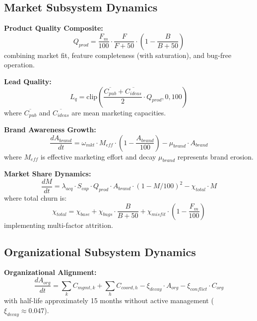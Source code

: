 \documentclass[alpha-refs]{wiley-article}
\begin{document}
\subsection{Market Subsystem Dynamics}

\textbf{Product Quality Composite:}
\begin{equation}
Q_{prod} = \frac{F_m}{100} \cdot \frac{F}{F + 50} \cdot \left(1 - \frac{B}{B + 50}\right)
\end{equation}
combining market fit, feature completeness (with saturation), and bug-free operation.

\textbf{Lead Quality:}
\begin{equation}
L_q = \text{clip}\left(\frac{\overline{C_{pub}} + \overline{C_{ideas}}}{2} \cdot Q_{prod}, 0, 100\right)
\end{equation}
where $\overline{C_{pub}}$ and $\overline{C_{ideas}}$ are mean marketing capacities.

\textbf{Brand Awareness Growth:}
\begin{equation}
\frac{dA_{brand}}{dt} = \omega_{mkt} \cdot M_{eff} \cdot \left(1 - \frac{A_{brand}}{100}\right) - \mu_{brand} \cdot A_{brand}
\end{equation}
where $M_{eff}$ is effective marketing effort and decay $\mu_{brand}$ represents brand erosion.

\textbf{Market Share Dynamics:}
\begin{equation}
\frac{dM}{dt} = \lambda_{acq} \cdot S_{cap} \cdot Q_{prod} \cdot A_{brand} \cdot (1-M/100)^2 - \chi_{total} \cdot M
\end{equation}
where total churn is:
\begin{equation}
\chi_{total} = \chi_{base} + \chi_{bugs} \cdot \frac{B}{B + 50} + \chi_{misfit} \cdot \left(1 - \frac{F_m}{100}\right)
\end{equation}
implementing multi-factor attrition.

\subsection{Organizational Subsystem Dynamics}

\textbf{Organizational Alignment:}
\begin{equation}
\frac{dA_{org}}{dt} = \sum_k C_{mgmt,k} + \sum_h C_{coord,h} - \xi_{decay} \cdot A_{org} - \xi_{conflict} \cdot C_{org}
\end{equation}
with half-life approximately 15 months without active management ($\xi_{decay} \approx 0.047$).
\end{document}
